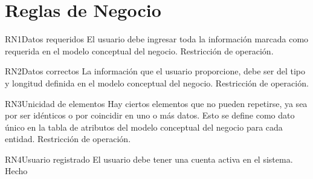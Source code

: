 \section{Reglas de Negocio}

\begin{BussinesRule}{RN1}{Datos requeridos} 
\BRitem[Descripción:] El usuario debe ingresar toda la información marcada como requerida en el modelo conceptual del negocio.
\BRitem[Tipo:] Restricción de operación. 
\end{BussinesRule}

\begin{BussinesRule}{RN2}{Datos correctos} 
\BRitem[Descripción:] La información que el usuario proporcione, debe ser del tipo y longitud definida en el modelo conceptual del negocio.
\BRitem[Tipo:] Restricción de operación. 
\end{BussinesRule}

\begin{BussinesRule}{RN3}{Unicidad de elementos} 
\BRitem[Descripción:] Hay ciertos elementos que no pueden repetirse, ya sea por ser idénticos o por coincidir en uno o más datos. Esto se define como dato único en la tabla de atributos del modelo conceptual del negocio para cada entidad.
\BRitem[Tipo:] Restricción de operación. 
\end{BussinesRule}

\begin{BussinesRule}{RN4}{Usuario registrado} 
\BRitem[Descripción:] El usuario debe tener una cuenta activa en el sistema.
\BRitem[Tipo:] Hecho
\end{BussinesRule}

